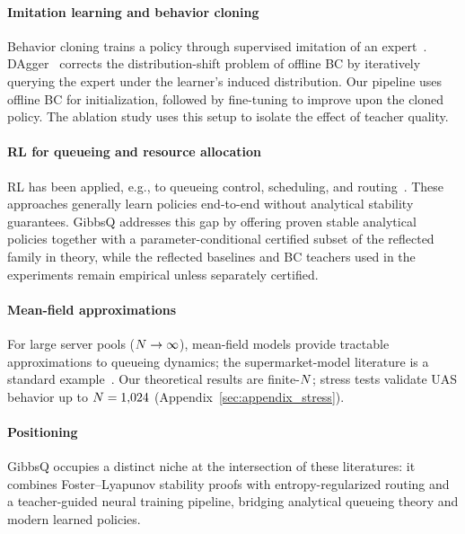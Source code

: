 \paragraph{Imitation learning and behavior cloning}
Behavior cloning trains a policy through supervised imitation of an expert~\cite{osa2018algorithmic}.
DAgger~\cite{ross2011reduction} corrects the distribution-shift problem of offline BC by iteratively querying the expert under the learner's induced distribution.
Our pipeline uses offline BC for initialization, followed by \reinforce{} fine-tuning to improve upon the cloned policy.
The ablation study uses this setup to isolate the effect of teacher quality.

\paragraph{RL for queueing and resource allocation}
RL has been applied, e.g., to queueing control, scheduling, and routing~\cite{dai2022queueing}.
These approaches generally learn policies end-to-end without analytical stability guarantees.
GibbsQ addresses this gap by offering proven stable analytical policies together with a parameter-conditional certified subset of the reflected family in theory, while the reflected baselines and BC teachers used in the experiments remain empirical unless separately certified.

\paragraph{Mean-field approximations}
For large server pools ($N \to \infty$), mean-field models provide tractable approximations to queueing dynamics; the supermarket-model literature is a standard example~\cite{vvedenskaya1996queueing,mitzenmacher2001power}.
Our theoretical results are finite-$N$; stress tests validate UAS behavior up to $N = 1{,}024$ (Appendix~\ref{sec:appendix_stress}).

\paragraph{Positioning}
GibbsQ occupies a distinct niche at the intersection of these literatures: it combines Foster--Lyapunov stability proofs with entropy-regularized routing and a teacher-guided neural training pipeline, bridging analytical queueing theory and modern learned policies.
